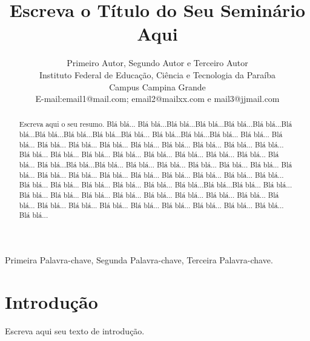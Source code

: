 \documentclass[journal]{IEEEtran}
\begin{document}
\title{Escreva o Título do Seu Seminário Aqui}


\author{Primeiro Autor, Segundo Autor e Terceiro Autor\\

Instituto Federal de Educação, Ciência e Tecnologia da Paraíba\\Campus Campina Grande\\
E-mail:email1@mail.com; email2@mailxx.com e mail3@jjmail.com\\
}



\maketitle


\begin{abstract}
Escreva aqui o seu resumo. Blá blá... 
Blá blá...Blá blá...Blá blá...Blá blá...Blá blá...Blá blá...Blá blá...Blá blá...Blá blá...Blá blá...
Blá blá...Blá blá...Blá blá... Blá blá... Blá blá... Blá blá... Blá blá... Blá blá... Blá blá... Blá blá... Blá blá... 
Blá blá... Blá blá... Blá blá... Blá blá... Blá blá... Blá blá... Blá blá... Blá blá... Blá blá... Blá blá... Blá blá... 
Blá blá...Blá blá...Blá blá... Blá blá... Blá blá... Blá blá... Blá blá... Blá blá... Blá blá... Blá blá... Blá blá... 
Blá blá... Blá blá... Blá blá... Blá blá... Blá blá... Blá blá... Blá blá... Blá blá... Blá blá... Blá blá... Blá blá... 
Blá blá...Blá blá...Blá blá... Blá blá... Blá blá... Blá blá... Blá blá... Blá blá... Blá blá... Blá blá... Blá blá... 
Blá blá... Blá blá... Blá blá... Blá blá... Blá blá... Blá blá... Blá blá... Blá blá... Blá blá... Blá blá... Blá blá... 

\end{abstract}



\begin{IEEEkeywords}
Primeira Palavra-chave, Segunda Palavra-chave, Terceira Palavra-chave.
\end{IEEEkeywords}







\section{Introdução}

Escreva aqui seu texto de introdução. 
\end{document}
